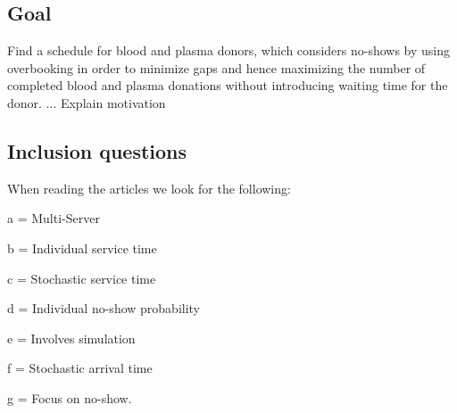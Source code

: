 \documentclass[a4paper,12pt]{article}
\begin{document}
\subsection{Goal}

Find a schedule for blood and plasma donors, which considers no-shows by using overbooking in order to minimize gaps and hence maximizing the number of completed blood and plasma donations without introducing waiting time for the donor.
... Explain motivation

\subsection{Inclusion questions}
When reading the articles we look for the following:

a = Multi-Server

b = Individual service time

c = Stochastic service time


d = Individual no-show probability

e = Involves simulation

f = Stochastic arrival time

g = Focus on no-show.
\end{document}
